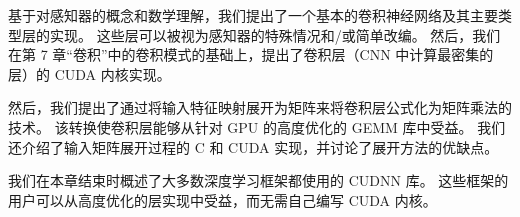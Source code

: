 基于对感知器的概念和数学理解，我们提出了一个基本的卷积神经网络及其主要类型层的实现。 
这些层可以被视为感知器的特殊情况和/或简单改编。 
然后，我们在第 7 章“卷积”中的卷积模式的基础上，提出了卷积层（CNN 中计算最密集的层）的 CUDA 内核实现。

然后，我们提出了通过将输入特征映射展开为矩阵来将卷积层公式化为矩阵乘法的技术。 
该转换使卷积层能够从针对 GPU 的高度优化的 GEMM 库中受益。 
我们还介绍了输入矩阵展开过程的 C 和 CUDA 实现，并讨论了展开方法的优缺点。

我们在本章结束时概述了大多数深度学习框架都使用的 CUDNN 库。 
这些框架的用户可以从高度优化的层实现中受益，而无需自己编写 CUDA 内核。